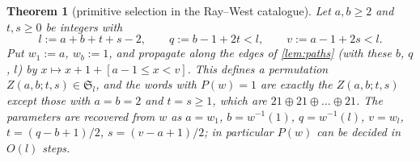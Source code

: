 \documentclass[11pt,reqno]{amsart}
\theoremstyle{plain}
\newtheorem{theorem}{Theorem}[section]
\theoremstyle{definition}
\theoremstyle{remark}
\newcommand{\Sym}{\mathfrak{S}}
\begin{document}
\begin{theorem}[primitive selection in the Ray--West catalogue]\label{thm:catalogue}
Let $a,b\ge2$ and $t,s\ge0$ be integers with
\begin{equation}\label{eq:cat}
l:=a+b+t+s-2,\qquad q:=b-1+2t<l,\qquad v:=a-1+2s<l .
\end{equation}
Put $w_1:=a$, $w_b:=1$, and propagate along the edges of \cref{lem:paths} (with these $b$, $q$, $l$) by $x\mapsto x+1+[a-1\le x<v]$. This defines a permutation $Z(a,b;t,s)\in\Sym_l$, and the words with $P(w)=1$ are exactly the $Z(a,b;t,s)$ except those with $a=b=2$ and $t=s\ge1$, which are $21\oplus21\oplus\dots\oplus21$. The parameters are recovered from $w$ as $a=w_1$, $b=w^{-1}(1)$, $q=w^{-1}(l)$, $v=w_l$, $t=(q-b+1)/2$, $s=(v-a+1)/2$; in particular $P(w)$ can be decided in $O(l)$ steps.
\end{theorem}
\end{document}
